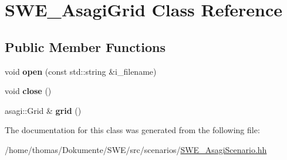 \hypertarget{classSWE__AsagiGrid}{\section{S\-W\-E\-\_\-\-Asagi\-Grid Class Reference}
\label{classSWE__AsagiGrid}
}
\subsection*{Public Member Functions}
\begin{DoxyCompactItemize}
\item 
\hypertarget{classSWE__AsagiGrid_a36c68a45fd51ed1bae1971ac252ed1cc}{void {\bfseries open} (const std\-::string \&i\-\_\-filename)}\label{classSWE__AsagiGrid_a36c68a45fd51ed1bae1971ac252ed1cc}

\item 
\hypertarget{classSWE__AsagiGrid_ab0dca1af30b0d89f3a68f429c77b0840}{void {\bfseries close} ()}\label{classSWE__AsagiGrid_ab0dca1af30b0d89f3a68f429c77b0840}

\item 
\hypertarget{classSWE__AsagiGrid_a8596fb0fdadd3ab51760d7101d6e89d1}{asagi\-::\-Grid \& {\bfseries grid} ()}\label{classSWE__AsagiGrid_a8596fb0fdadd3ab51760d7101d6e89d1}

\end{DoxyCompactItemize}


The documentation for this class was generated from the following file\-:\begin{DoxyCompactItemize}
\item 
/home/thomas/\-Dokumente/\-S\-W\-E/src/scenarios/\hyperlink{SWE__AsagiScenario_8hh}{S\-W\-E\-\_\-\-Asagi\-Scenario.\-hh}\end{DoxyCompactItemize}
